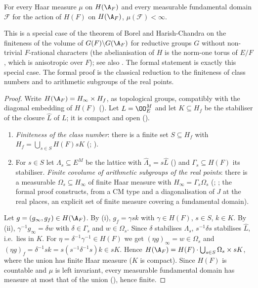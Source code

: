 \begin{theorem}\label{pf:sh-div:finvol}
For every Haar measure $\mu$ on $H(\A_F)$ and every measurable fundamental domain $\mathcal F$ for the action of $H(F)$ on
$H(\A_F)$, $\mu(\mathcal F)<\infty$.
\end{theorem}

This is a special case of the theorem of Borel and Harish-Chandra \cite{BorelHarishChandra1962} on the finiteness of the volume of
$G(F)\backslash G(\A_F)$ for reductive groups $G$ without non-trivial $F$-rational characters (the abelianisation of $H$ is the
norm-one torus of $E/F$, which is anisotropic over $F$); see also \cite{Borel1963,PlatonovRapinchuk1994}. The formal statement is
exactly this special case. The formal proof is the classical reduction to the finiteness of class numbers and to arithmetic
subgroups of the real points.

\begin{proof}
Write $H(\A_F)=H_\infty\times H_f$, as topological groups, compatibly with the diagonal embedding of $H(F)$
(). Let $L=\OO_E^M$ and let $K\subseteq H_f$ be the stabiliser of the
closure $\widehat L$ of $L$; it is compact and open ().
\begin{enumerate}[label=(\roman*)]
\item \emph{Finiteness of the class number}: there is a finite set $S\subseteq H_f$ with $H_f=\bigcup_{s\in S}H(F)sK$
(; \cite{Borel1963}).
\item For $s\in S$ let $\Lambda_s\subseteq E^M$ be the lattice with $\widehat\Lambda_s=s\widehat L$
() and $\Gamma_s\subseteq H(F)$ its stabiliser. \emph{Finite covolume of
arithmetic subgroups of the real points}: there is a measurable $\Omega_s\subseteq H_\infty$ of finite Haar measure with
$H_\infty=\Gamma_s\Omega_s$ (; \cite{BorelHarishChandra1962};
the formal proof constructs, from a CM type and a diagonalisation of $J$ at the real places, an explicit set of finite measure
covering a fundamental domain).
\end{enumerate}
Let $g=(g_\infty,g_f)\in H(\A_F)$. By (i), $g_f=\gamma sk$ with $\gamma\in H(F)$, $s\in S$, $k\in K$. By (ii),
$\gamma^{-1}g_\infty=\delta w$ with $\delta\in\Gamma_s$ and $w\in\Omega_s$. Since $\delta$ stabilises $\Lambda_s$, $s^{-1}\delta s$
stabilises $\widehat L$, i.e.\ lies in $K$. For $\eta=\delta^{-1}\gamma^{-1}\in H(F)$ we
get $(\eta g)_\infty=w\in\Omega_s$ and $(\eta g)_f=\delta^{-1}sk=s(s^{-1}\delta^{-1}s)k\in sK$. Hence $H(\A_F)=H(F)\cdot\bigcup_{s\in S}\Omega_s\times
sK$, where the union has finite Haar measure ($K$ is compact). Since $H(F)$ is countable and $\mu$ is left invariant, every measurable
fundamental domain has measure at most that of the union (), hence
finite.
\end{proof}

